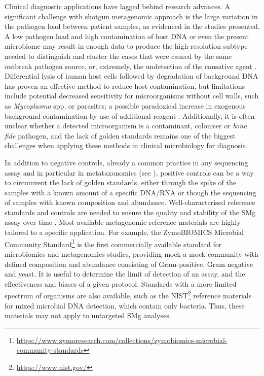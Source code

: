 Clinical diagnostic applications have lagged behind research advances. A significant challenge with shotgun metagenomic approach is the large variation in the pathogen load between patient samples, as evidenced in the studies presented. A low pathogen load and  high contamination of host DNA or even the present microbiome may result in enough data to produce the high-resolution subtype needed to distinguish and cluster the cases that were caused by the same outbreak pathogen source, or, extremely, the undetection of the causative agent \citep{carleton_metagenomic_2019, chiu_clinical_2019}. Differential lysis of human host cells followed by degradation of background DNA has proven an effective method to reduce host contamination, but limitations include potential decreased sensitivity for microorganisms without cell walls, such as \textit{Mycoplasma} spp. or parasites; a possible paradoxical increase in exogenous background contamination by use of additional reagent \citep{salter_reagent_2014, oneil_ribosomal_2013, feehery_method_2013}. Additionally, it is often unclear whether a detected microorganism is a contaminant, coloniser or \textit{bona fide} pathogen, and the lack of golden standards remains one of the biggest challenges when applying these methods in clinical microbiology for diagnosis. 

In addition to negative controls, already a common practice in any sequencing assay and in particular in metataxonomics (see ), positive controls can be a way to circumvent the lack of golden standards, either through the spike of the samples with a known amount of a specific DNA/RNA or though the sequencing of samples with known composition and abundance. Well-characterised reference standards and controls are needed to ensure the quality and stability of the \ac{SMg} assay over time \citep{chiu_clinical_2019, mcintyre_comprehensive_2017}. Most available metagenomic reference materials are highly tailored to a specific application. For example, the ZymoBIOMICS Microbial Community Standard\footnote{\url{https://www.zymoresearch.com/collections/zymobiomics-microbial-community-standards}} is the first commercially available standard for microbiomics and metagenomics studies, providing mock a mock community with defined composition and abundance consisting of Gram-positive, Gram-negative and yeast. It is useful to determine the limit of detection of an assay, and the effectiveness and biases of a given protocol. Standards with a more limited spectrum of organisms are also available, such as the \ac{NIST}\footnote{\url{https://www.nist.gov/}} reference materials for mixed microbial DNA detection, which contain only bacteria. Thus, these materials may not apply to untargeted \ac{SMg} analyses.


